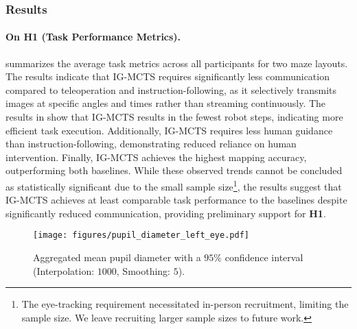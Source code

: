 \subsubsection{Results}
\paragraph{On H1 (Task Performance Metrics).} 
 summarizes the average task metrics across all participants for two maze layouts. The results indicate that IG-MCTS requires significantly less communication compared to teleoperation and instruction-following, as it selectively transmits images at specific angles and times rather than streaming continuously. 
The results in  show that IG-MCTS results in the fewest robot steps, indicating more efficient task execution. Additionally, IG-MCTS requires less human guidance than instruction-following, demonstrating reduced reliance on human intervention. Finally, IG-MCTS achieves the highest mapping accuracy, outperforming both baselines. 
While these observed trends cannot be concluded as statistically significant due to the small sample size\footnote{The eye-tracking requirement necessitated in-person recruitment, limiting the sample size. We leave recruiting larger sample sizes to future work.}, the results suggest that IG-MCTS achieves at least comparable task performance to the baselines despite significantly reduced communication, providing preliminary support for \textbf{H1}.

\begin{figure}
    \centering
    \texttt{[image: figures/pupil\_diameter\_left\_eye.pdf]}
    \vskip -0.1in
    \caption{Aggregated mean pupil diameter with a $95\%$ confidence interval (Interpolation: $1000$, Smoothing: $5$).}
    \label{fig:pupil_diameter_plot}
\end{figure}

